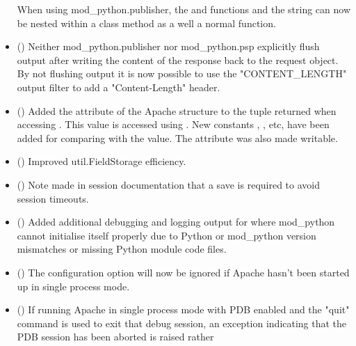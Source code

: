 \begin{itemize}
      When using mod_python.publisher, the  and
       functions and the  string
      can now be nested within a class method as a well a normal function.
    \item
      ()
      Neither mod_python.publisher nor mod_python.psp explicitly flush
      output after writing the content of the response back to the request
      object. By not flushing output it is now possible to use the
      "CONTENT_LENGTH" output filter to add a "Content-Length" header.
    \item
      ()
      Added the  attribute of the Apache 
      structure to the tuple returned when accessing .
      This value is accessed using .
      New constants , ,
       etc, have been added for comparing with the
       value. The  attribute
      was also made writable.
    \item
      ()
      Improved util.FieldStorage efficiency.
    \item
      ()
      Note made in session documentation that a save is required to avoid
      session timeouts.
    \item
      ()
      Added additional debugging and logging output for where mod_python
      cannot initialise itself properly due to Python or mod_python version
      mismatches or missing Python module code files.
    \item
      ()
      The  configuration option will now be ignored
      if Apache hasn't been started up in single process mode.
    \item
      ()
      If running Apache in single process mode with PDB enabled and the
      "quit" command is used to exit that debug session, an exception
      indicating that the PDB session has been aborted is raised rather

\end{itemize}
